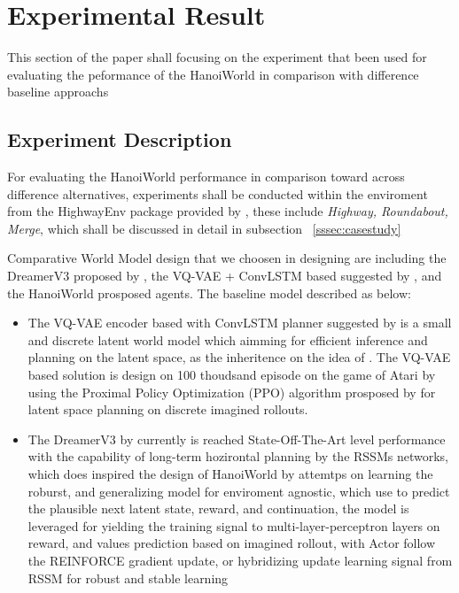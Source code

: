\section{Experimental Result}
\label{sec:experiment}
This section of the paper shall focusing on the experiment that been used for evaluating the peformance of the HanoiWorld in comparison with difference baseline approachs

\subsection{Experiment Description}

For evaluating the HanoiWorld performance in comparison toward across difference alternatives, experiments shall be conducted within the enviroment from the HighwayEnv package provided by \cite{faramafoundation_2025_gymnasium}, these include \textit{Highway, Roundabout, Merge}, which shall be discussed in detail in subsection ~\ref{sssec:casestudy}

Comparative World Model design that we choosen in designing are including the DreamerV3 proposed by \cite{Hafner2023}, the VQ-VAE + ConvLSTM based suggested by \cite{robine_2020_smaller}, and the HanoiWorld prosposed agents. The baseline model described as below:
\begin{itemize}
    \item The VQ-VAE encoder based with ConvLSTM planner suggested by \cite{robine_2020_smaller} is a small and discrete latent world model which aimming for efficient inference and planning on the latent space, as the inheritence on the idea of \cite{ha_2018_world}. The VQ-VAE based solution is design on 100 thoudsand episode on the game of Atari by using the Proximal Policy Optimization (PPO) algorithm prosposed by \cite{schulman_2017_proximal} for latent space planning on discrete imagined rollouts.
    \item The DreamerV3 by \cite{Hafner2023} currently is reached State-Off-The-Art level performance with the capability of long-term hozirontal planning by the RSSMs networks, which does inspired the design of HanoiWorld by attemtps on learning the roburst, and generalizing model for enviroment agnostic, which use to predict the plausible next latent state, reward, and continuation, the model is leveraged for yielding the training signal to multi-layer-perceptron layers on reward, and values prediction based on imagined rollout, with Actor follow the REINFORCE gradient update, or hybridizing update learning signal from RSSM for robust and stable learning
\end{itemize}


